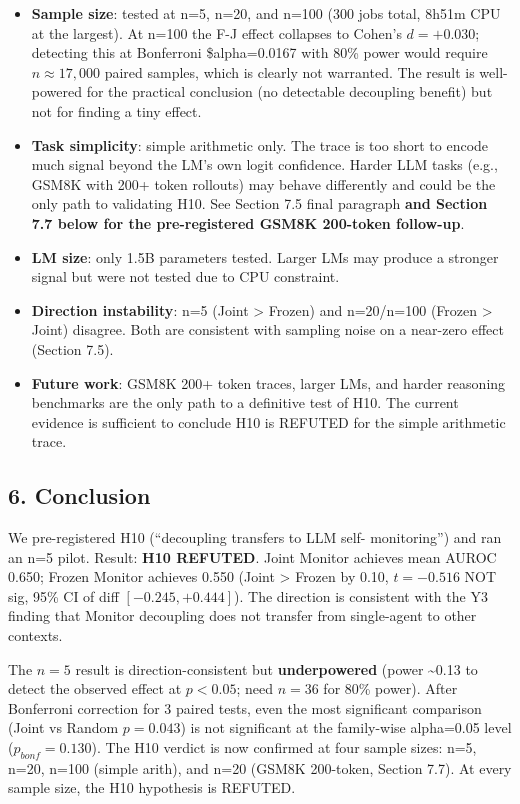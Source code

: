 \documentclass[
]{article}
\providecommand{\tightlist}{%
  \setlength{\itemsep}{0pt}\setlength{\parskip}{0pt}}
\begin{document}
\begin{itemize}
\tightlist
\item
  \textbf{Sample size}: tested at n=5, n=20, and n=100 (300 jobs total,
  8h51m CPU at the largest). At n=100 the F-J effect collapses to
  Cohen's \(d=+0.030\); detecting this at Bonferroni \$alpha=0.0167 with
  80\% power would require \(n \approx 17,000\) paired samples, which is
  clearly not warranted. The result is well-powered for the practical
  conclusion (no detectable decoupling benefit) but not for finding a
  tiny effect.
\item
  \textbf{Task simplicity}: simple arithmetic only. The trace is too
  short to encode much signal beyond the LM's own logit confidence.
  Harder LLM tasks (e.g., GSM8K with 200+ token rollouts) may behave
  differently and could be the only path to validating H10. See Section
  7.5 final paragraph \textbf{and Section 7.7 below for the
  pre-registered GSM8K 200-token follow-up}.
\item
  \textbf{LM size}: only 1.5B parameters tested. Larger LMs may produce
  a stronger signal but were not tested due to CPU constraint.
\item
  \textbf{Direction instability}: n=5 (Joint \textgreater{} Frozen) and
  n=20/n=100 (Frozen \textgreater{} Joint) disagree. Both are consistent
  with sampling noise on a near-zero effect (Section 7.5).
\item
  \textbf{Future work}: GSM8K 200+ token traces, larger LMs, and harder
  reasoning benchmarks are the only path to a definitive test of H10.
  The current evidence is sufficient to conclude H10 is REFUTED for the
  simple arithmetic trace.
\end{itemize}

\subsection{6. Conclusion}\label{conclusion}

We pre-registered H10 (``decoupling transfers to LLM self- monitoring'')
and ran an n=5 pilot. Result: \textbf{H10 REFUTED}. Joint Monitor
achieves mean AUROC 0.650; Frozen Monitor achieves 0.550 (Joint
\textgreater{} Frozen by 0.10, \(t=-0.516\) NOT sig, 95\% CI of diff
\([-0.245, +0.444]\)). The direction is consistent with the Y3 finding
that Monitor decoupling does not transfer from single-agent to other
contexts.

The \(n=5\) result is direction-consistent but \textbf{underpowered}
(power \textasciitilde0.13 to detect the observed effect at \(p<0.05\);
need \(n=36\) for 80\% power). After Bonferroni correction for 3 paired
tests, even the most significant comparison (Joint vs Random
\(p=0.043\)) is not significant at the family-wise alpha=0.05 level
(\(p_{bonf}=0.130\)). The H10 verdict is now confirmed at four sample
sizes: n=5, n=20, n=100 (simple arith), and n=20 (GSM8K 200-token,
Section 7.7). At every sample size, the H10 hypothesis is REFUTED.
\end{document}

